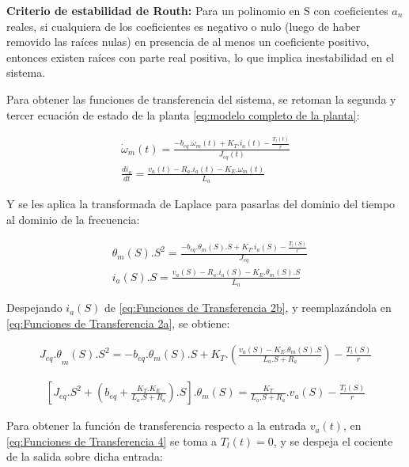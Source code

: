 \documentclass{article}
\begin{document}
\begin{sloppypar}
\hfill

\textbf{Criterio de estabilidad de Routh:} Para un polinomio en S con coeficientes $a_n$ reales, si cualquiera de los coeficientes es negativo o nulo (luego de haber removido las raíces nulas) en presencia de al menos un coeficiente positivo, entonces existen raíces con parte real positiva, lo que implica inestabilidad en el sistema.

Para obtener las funciones de transferencia del sistema, se retoman la segunda y tercer ecuación de estado de la planta \ref{eq:modelo completo de la planta}:

\begin{align} \label{eq:Funciones de Transferencia 1}
    \dot{\omega}_m\left(t\right)=\frac{ -b_{eq}.\omega_m(t)+K_T.i_a(t)-\frac{T_l\left(t\right)}{r} }{ J_{eq}(t) }
    \\
    \frac{di_a}{dt}=\frac{v_a(t)-R_a.i_a(t)-K_E.\omega_m(t)}{L_a}
\end{align}

Y se les aplica la transformada de Laplace para pasarlas del dominio del tiempo al dominio de la frecuencia:

\begin{align}
    & \label{eq:Funciones de Transferencia 2a} \theta_m\left(S\right).S^2=\frac{-b_{eq}{.\theta}_m\left(S\right).S+K_T.i_a\left(S\right)-\frac{T_l\left(S\right)}{r}}{J_{eq}}
    \\
    & \label{eq:Funciones de Transferencia 2b} i_a(S).S=\frac{v_a\left(S\right)-R_a.i_a\left(S\right)-K_E.\theta_m\left(S\right).S}{L_a}
\end{align}

Despejando $i_a(S)$ de \ref{eq:Funciones de Transferencia 2b}, y reemplazándola en \ref{eq:Funciones de Transferencia 2a}, se obtiene:

\begin{align} \label{eq:Funciones de Transferencia 3}
    {J_{eq}.\theta}_m\left(S\right).S^2=-b_{eq}{.\theta}_m\left(S\right).S+K_T.\left(\frac{v_a\left(S\right)-K_E.\theta_m\left(S\right).S}{L_a.S+R_a}\right)-\frac{T_l\left(S\right)}{r}
\end{align}

\begin{align} \label{eq:Funciones de Transferencia 4}
    \left[J_{eq}.S^2+\left(b_{eq}+\frac{K_T.K_E}{L_a.S+R_a}\right).S\right].\theta_m\left(S\right)=\frac{K_T}{L_a.S+R_a}.v_a\left(S\right)-\frac{T_l\left(S\right)}{r}
\end{align}

Para obtener la función de transferencia respecto a la entrada $v_a(t)$, en \ref{eq:Funciones de Transferencia 4} se toma a $T_l(t)=0$, y se despeja el cociente de la salida sobre dicha entrada:


\end{sloppypar}
\end{document}
